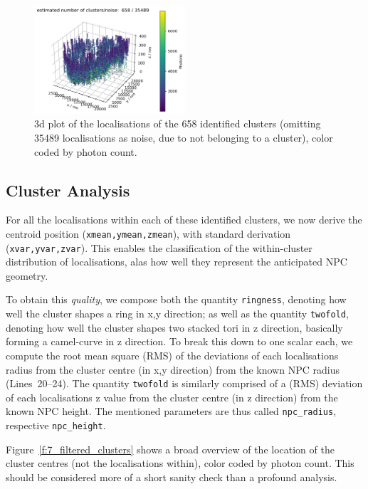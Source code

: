 \documentclass[11pt, a4paper, oneside, twocolumn]{report}
\renewcommand{\tt}{\texttt}
\newcommand{\e}{\emph}
\begin{document}
\begin{figure}[h!]
  \centering
  \includegraphics[width=0.5\textwidth]{6_clustering.png}
  \caption{3d plot of the localisations of the 658 identified clusters
    (omitting 35489 localisations as noise, due to not belonging to a
    cluster), color coded by photon count.}
  \label{f:6_clustering}
\end{figure}


\subsection{Cluster Analysis}

For all the localisations within each of these identified clusters, we
now derive the centroid position (\tt{xmean,ymean,zmean}), with
standard derivation (\tt{xvar,yvar,zvar}). This enables the
classification of the within-cluster distribution of localisations,
alas how well they represent the anticipated NPC geometry.

To obtain this \e{quality}, we compose both the quantity
\tt{ringness}, denoting how well the cluster shapes a ring in x,y
direction; as well as the quantity \tt{twofold}, denoting how well the
cluster shapes two stacked tori in z direction, basically forming a
camel-curve in z direction. To break this down to one scalar each, we
compute the root mean square (RMS) of the deviations of each
localisations radius from the cluster centre (in x,y direction) from
the known NPC radius (Lines~20--24). The quantity \tt{twofold} is
similarly comprised of a (RMS) deviation of each localisations z value
from the cluster centre (in z direction) from the known NPC
height. The mentioned parameters are thus called \tt{npc\_radius},
respective \tt{npc\_height}.

Figure~\ref{f:7_filtered_clusters} shows a broad overview of the
location of the cluster centres (not the localisations within), color
coded by photon count. This should be considered more of a short
sanity check than a profound analysis.

\end{document}
